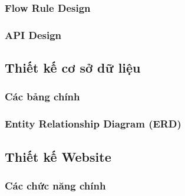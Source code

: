 \subsubsection{Flow Rule Design}

\subsubsection{API Design}

\subsection{Thiết kế cơ sở dữ liệu}

\subsubsection{Các bảng chính}

\subsubsection{Entity Relationship Diagram (ERD)}

\subsection{Thiết kế Website}

\subsubsection{Các chức năng chính}

